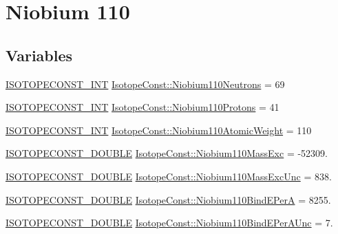 \hypertarget{group___isotope_const-_niobium-_nb110}{}\section{Niobium 110}
\label{group___isotope_const-_niobium-_nb110}
\subsection*{Variables}
\begin{DoxyCompactItemize}
\item 
\mbox{\hyperlink{group___isotope_const-_macros_ga5f18360b3e99483a35c32d789e62621c}{I\+S\+O\+T\+O\+P\+E\+C\+O\+N\+S\+T\+\_\+\+I\+NT}} \mbox{\hyperlink{group___isotope_const-_niobium-_nb110_ga8e05dfd36b806830291a75244993e925}{Isotope\+Const\+::\+Niobium110\+Neutrons}} = 69
\item 
\mbox{\hyperlink{group___isotope_const-_macros_ga5f18360b3e99483a35c32d789e62621c}{I\+S\+O\+T\+O\+P\+E\+C\+O\+N\+S\+T\+\_\+\+I\+NT}} \mbox{\hyperlink{group___isotope_const-_niobium-_nb110_gae5e9271a5b839be1089a43f9c3584893}{Isotope\+Const\+::\+Niobium110\+Protons}} = 41
\item 
\mbox{\hyperlink{group___isotope_const-_macros_ga5f18360b3e99483a35c32d789e62621c}{I\+S\+O\+T\+O\+P\+E\+C\+O\+N\+S\+T\+\_\+\+I\+NT}} \mbox{\hyperlink{group___isotope_const-_niobium-_nb110_ga833ca85e738501552e7809d00230ecc8}{Isotope\+Const\+::\+Niobium110\+Atomic\+Weight}} = 110
\item 
\mbox{\hyperlink{group___isotope_const-_macros_ga8f45a7272ce02c0b4c65c44636ed719a}{I\+S\+O\+T\+O\+P\+E\+C\+O\+N\+S\+T\+\_\+\+D\+O\+U\+B\+LE}} \mbox{\hyperlink{group___isotope_const-_niobium-_nb110_gade430c9bfde57330bdc0905afdcba0ee}{Isotope\+Const\+::\+Niobium110\+Mass\+Exc}} = -\/52309.
\item 
\mbox{\hyperlink{group___isotope_const-_macros_ga8f45a7272ce02c0b4c65c44636ed719a}{I\+S\+O\+T\+O\+P\+E\+C\+O\+N\+S\+T\+\_\+\+D\+O\+U\+B\+LE}} \mbox{\hyperlink{group___isotope_const-_niobium-_nb110_ga18358f3f5452e1b60d912dc06c77c717}{Isotope\+Const\+::\+Niobium110\+Mass\+Exc\+Unc}} = 838.
\item 
\mbox{\hyperlink{group___isotope_const-_macros_ga8f45a7272ce02c0b4c65c44636ed719a}{I\+S\+O\+T\+O\+P\+E\+C\+O\+N\+S\+T\+\_\+\+D\+O\+U\+B\+LE}} \mbox{\hyperlink{group___isotope_const-_niobium-_nb110_ga6cbd270b60222886b385df2daee642e2}{Isotope\+Const\+::\+Niobium110\+Bind\+E\+PerA}} = 8255.
\item 
\mbox{\hyperlink{group___isotope_const-_macros_ga8f45a7272ce02c0b4c65c44636ed719a}{I\+S\+O\+T\+O\+P\+E\+C\+O\+N\+S\+T\+\_\+\+D\+O\+U\+B\+LE}} \mbox{\hyperlink{group___isotope_const-_niobium-_nb110_ga746330f1abd2f22d4bd451154480a9da}{Isotope\+Const\+::\+Niobium110\+Bind\+E\+Per\+A\+Unc}} = 7.

\end{DoxyCompactItemize}
